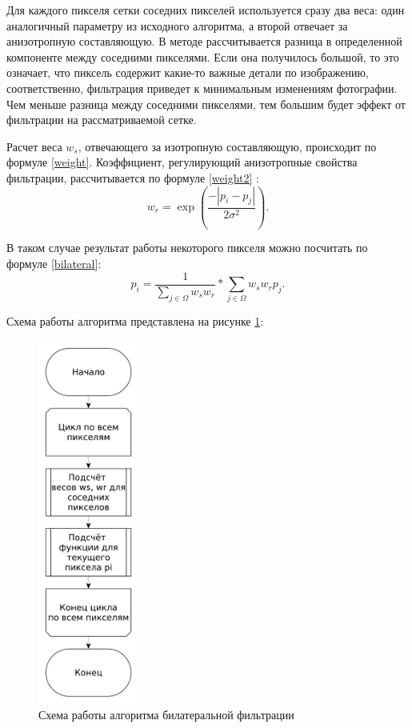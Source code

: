 Для каждого пикселя сетки соседних пикселей используется сразу два веса: один аналогичный параметру из исходного алгоритма, а второй отвечает за анизотропную составляющую. 
В методе рассчитывается разница в определенной компоненте между соседними пикселями.
Если она получилось большой, то это означает, что пиксель содержит какие-то важные детали по изображению, соответственно, фильтрация приведет к минимальным изменениям фотографии.
Чем меньше разница между соседними пикселями, тем большим будет эффект от фильтрации на рассматриваемой сетке.

Расчет веса $w_s$, отвечающего за изотропную составляющую, происходит по формуле \eqref{weight}. 
Коэффициент, регулирующий анизотропные свойства фильтрации, рассчитывается по формуле \eqref{weight2} \cite{bilateral}:
\begin{equation}
	\label{weight2}
	w_{r} = \exp\left(\frac{-|p_i - p_j|}{2\sigma^2}\right).
\end{equation}

В таком случае результат работы некоторого пикселя можно посчитать по формуле \eqref{bilateral}:
\begin{equation}
	\label{bilateral}
	p_i = \frac{1}{\sum_{j \in \Omega}^{} w_{s}w_{r}} * \sum_{j \in \Omega}^{} w_{s}w_{r}p_j.
\end{equation}

Схема работы алгоритма представлена на рисунке \ref{fig::bilateral}:
\FloatBarrier
\begin{figure}[h]	
	\begin{center}
		\includegraphics[height=12cm]{inc/pdf/bilateral.pdf}
	\end{center}
	\captionsetup{justification=centering}
	\caption{Схема работы алгоритма билатеральной фильтрации}
	\label{fig::bilateral}
\end{figure}
\FloatBarrier

